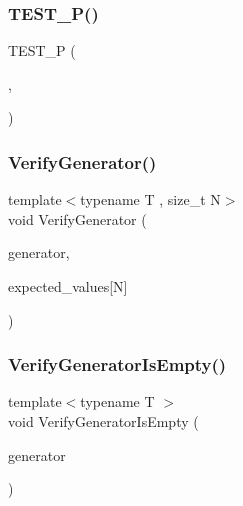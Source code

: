 \subsubsection{\texorpdfstring{TEST\_P()}{TEST\_P()}\hspace{0.1cm}{\footnotesize\ttfamily [16/16]}}
{\footnotesize\ttfamily T\+E\+S\+T\+\_\+P (\begin{DoxyParamCaption}\item[{\mbox{\hyperlink{class_parameterized_derived_test}{Parameterized\+Derived\+Test}}}]{,  }\item[{Sees\+Sequence}]{ }\end{DoxyParamCaption})}

\mbox{\label{_obj__test_2lib_2googletest-release-1_88_81_2googletest_2test_2googletest-param-test-test_8cc_a11c99cfbf44746868aa44105130887f7}} 
\subsubsection{\texorpdfstring{VerifyGenerator()}{VerifyGenerator()}}
{\footnotesize\ttfamily template$<$typename T , size\+\_\+t N$>$ \\
void Verify\+Generator (\begin{DoxyParamCaption}\item[{const Param\+Generator$<$ T $>$ \&}]{generator,  }\item[{const T(\&)}]{expected\+\_\+values\mbox{[}\+N\mbox{]} }\end{DoxyParamCaption})}

\mbox{\label{_obj__test_2lib_2googletest-release-1_88_81_2googletest_2test_2googletest-param-test-test_8cc_a85d74de6e554738555812410476b4eec}} 
\subsubsection{\texorpdfstring{VerifyGeneratorIsEmpty()}{VerifyGeneratorIsEmpty()}}
{\footnotesize\ttfamily template$<$typename T $>$ \\
void Verify\+Generator\+Is\+Empty (\begin{DoxyParamCaption}\item[{const Param\+Generator$<$ T $>$ \&}]{generator }\end{DoxyParamCaption})}



